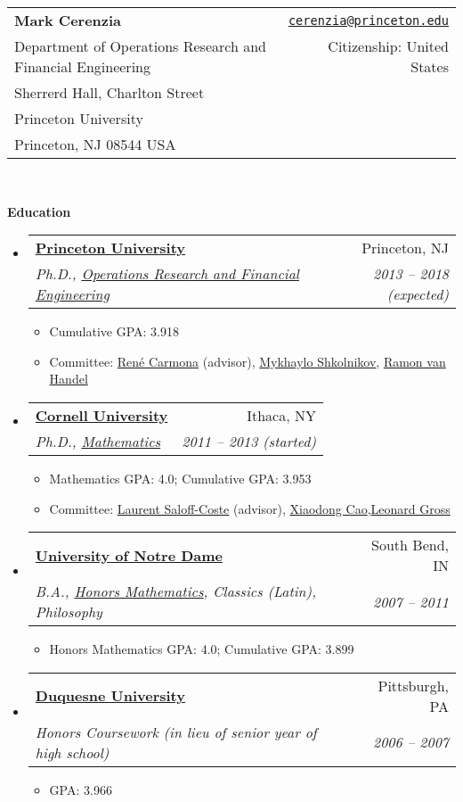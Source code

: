 \documentclass[letterpaper,11pt]{article}
\makeatletter
\newcommand{\resitem}[1]{\item #1 \vspace{-2pt}}
\newcommand{\resheading}[1]{{\large {\textbf{#1 \vphantom{p\^{E}}}}}}
\newenvironment{widetable}[1]
	       {\begin{tabular*}{#1}[t]{l@{\extracolsep{\fill}}r}}
	       {\end{tabular*}}
\newcommand{\ressubheading}[4]{
  \begin{widetable}{\textwidth - 28pt}
		\textbf{#1} & #2 \\
		\textit{#3} & \textit{#4} \\
  \end{widetable}
  \vspace{-12pt}}
\makeatother
\begin{document}
  \begin{widetable}{\textwidth}
    \textbf{\Large Mark Cerenzia }  & \href{mailto: cerenzia@princeton.edu}{\texttt{cerenzia@princeton.edu}} \\
    Department of Operations Research and Financial Engineering & Citizenship: United States \\
    Sherrerd Hall, Charlton Street  \\
    Princeton University \\
    Princeton, NJ 08544 USA
  \end{widetable}
\\

\vspace{0.1in}


\resheading{Education}
\begin{itemize}
\item
	\ressubheading{\href{http://www.princeton.edu/}{Princeton University}}
		      {Princeton, NJ}
		      {Ph.D., \href{http://orfe.princeton.edu}{Operations Research and Financial Engineering}}{2013 -- 2018 (expected)}
	              \begin{itemize}
		        \resitem{Cumulative GPA: 3.918}
		        \resitem{Committee: \href{https://www.princeton.edu/~rcarmona/}{Ren\'{e} Carmona} (advisor), \href{http://www.princeton.edu/~mykhaylo/}{Mykhaylo Shkolnikov}, \href{http://www.princeton.edu/~rvan/}{Ramon van Handel}}
	              \end{itemize}
\item
	\ressubheading{\href{http://www.cornell.edu}{Cornell University}}
		      {Ithaca, NY}
		      {Ph.D., \href{http://www.math.cornell.edu}{Mathematics}}{2011 -- 2013 (started)}
	              \begin{itemize}
		        \resitem{Mathematics GPA: 4.0; Cumulative GPA: 3.953}
		        \resitem{Committee: \href{http://www.math.cornell.edu/~lsc/lau.html}{Laurent Saloff-Coste} (advisor), \href{http://www.math.cornell.edu/~cao/}{Xiaodong Cao},\href{https://www.math.cornell.edu/m/People/bynetid/lg35}{Leonard Gross}}
	              \end{itemize}

\item
	\ressubheading{\href{http://www.nd.edu}{University of Notre Dame}}
		      {South Bend, IN}
		      {B.A., \href{http://math.nd.edu/undergraduate-program/}{Honors Mathematics}, Classics (Latin), Philosophy}
		      {2007 -- 2011}
	\begin{itemize}
		\resitem{Honors Mathematics GPA: 4.0; Cumulative GPA: 3.899}
	\end{itemize}
	\item
		\ressubheading{\href{http://www.duq.edu}{Duquesne University}}
		      {Pittsburgh, PA}
		      {Honors Coursework (in lieu of senior year of high school)}
		      {2006 -- 2007}
	\begin{itemize}
		\resitem{GPA: 3.966}
	\end{itemize}

\end{itemize}
\end{document}
